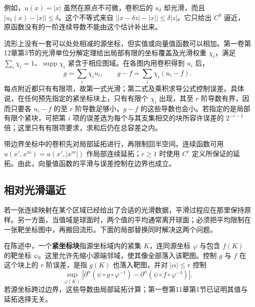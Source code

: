 例如，\(u(x)=|x|\) 虽然在原点不可微，卷积后的 \(u_\delta\) 却光滑，而且 \(|u_\delta(x)-|x||\le\delta\)。这个不等式来自 \(\bigl||x-\delta z|-|x|\bigr|\le\delta|z|\)。它只给出 \(C^0\) 逼近，原函数没有的一阶连续导数不能由这个估计补出来。

流形上没有一套可以处处相减的源坐标，但实值或向量值函数可以相加。第一卷第12章第3节的光滑单位分解定理给出局部有限的坐标覆盖及光滑权重 \(\chi_i\)，满足 \(\sum_i\chi_i=1\)、\(\operatorname{supp}\chi_i\) 紧含于相应图域。在各图内用卷积得到 \(u_i\) 后，
\[
	g=\sum_i\chi_i u_i,
	\qquad
	g-f=\sum_i\chi_i(u_i-f).
\]
每点附近都只有有限项，故第一式光滑；第二式及乘积求导公式控制误差。具体说，在任何预先指定的紧坐标块上，只有有限个 \(\chi_i\) 出现，其至 \(r\) 阶导数有界，因而只要各 \(u_i-f\) 的至 \(r\) 阶导数足够小，\(g-f\) 的这些导数也会小。若指定的是局部有限个紧块，可把第 \(i\) 项的误差选为每个与其支集相交的块所容许误差的 \(2^{-i-1}\) 倍；这里只有有限项要求，求和后仍在总容差之内。

带边界坐标中的卷积先对局部延拓进行，再限制回半空间。连续函数可用 \(u(x',x^m)=u(x',|x^m|)\) 作局部连续延拓；\(r\ge1\) 时使用 \(C^r\) 定义所保证的延拓。由此，向量值函数的平滑与误差控制在边界也成立。

\subsection{相对光滑逼近}
\label{g2:subsec:1401:02}

若一张连续映射在某个区域已经给出了合适的光滑数据，平滑过程应在那里保持原样。另一方面，当值域是球面时，两个值的平均通常离开球面；必须把平均限制在一张靶坐标图中，再搬回流形。下面的局部替换同时解决这两个问题。

在陈述中，一个\textbf{紧坐标块}指源坐标域内的紧集 \(K\)，连同源坐标 \(\varphi\) 与包含 \(f(K)\) 的靶坐标 \(\psi\)。这里允许先缩小源端邻域，使其像全部落入该靶图。控制 \(g\) 与 \(f\) 在这个块上的 \(r\) 阶误差，是指 \(g(K)\) 也落入靶图，并对 \(|\alpha|\le r\) 控制
\[
	\sup_{\varphi(K)}\left|\partial^\alpha(\psi\circ g\circ\varphi^{-1})-\partial^\alpha(\psi\circ f\circ\varphi^{-1})\right|.
\]
若源坐标跨过边界，这些导数由局部延拓计算；第一卷第11章第1节已证明其值与延拓选择无关。


